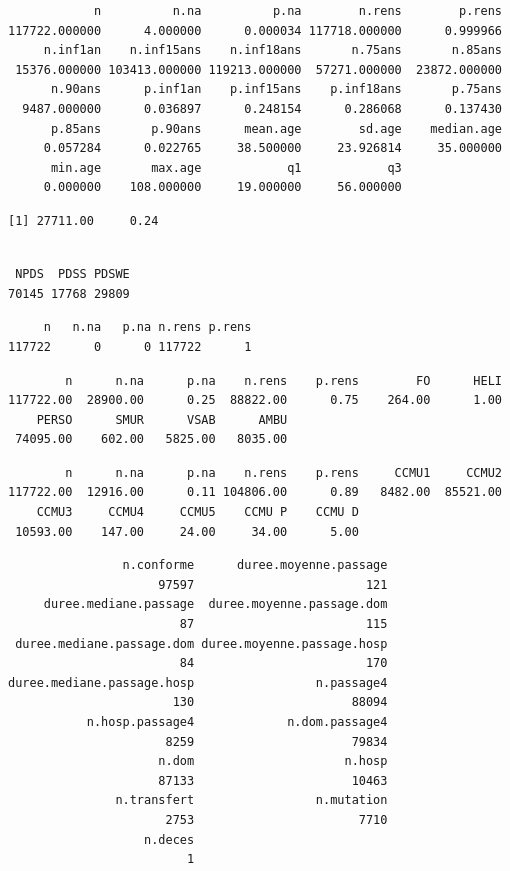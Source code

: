 \documentclass[]{article}
\begin{document}
\begin{verbatim}
            n          n.na          p.na        n.rens        p.rens 
117722.000000      4.000000      0.000034 117718.000000      0.999966 
     n.inf1an    n.inf15ans    n.inf18ans       n.75ans       n.85ans 
 15376.000000 103413.000000 119213.000000  57271.000000  23872.000000 
      n.90ans      p.inf1an    p.inf15ans    p.inf18ans       p.75ans 
  9487.000000      0.036897      0.248154      0.286068      0.137430 
      p.85ans       p.90ans      mean.age        sd.age    median.age 
     0.057284      0.022765     38.500000     23.926814     35.000000 
      min.age       max.age            q1            q3 
     0.000000    108.000000     19.000000     56.000000 
\end{verbatim}

\begin{verbatim}
[1] 27711.00     0.24
\end{verbatim}

\begin{verbatim}

 NPDS  PDSS PDSWE 
70145 17768 29809 
\end{verbatim}

\begin{verbatim}
     n   n.na   p.na n.rens p.rens 
117722      0      0 117722      1 
\end{verbatim}

\begin{verbatim}
        n      n.na      p.na    n.rens    p.rens        FO      HELI 
117722.00  28900.00      0.25  88822.00      0.75    264.00      1.00 
    PERSO      SMUR      VSAB      AMBU 
 74095.00    602.00   5825.00   8035.00 
\end{verbatim}

\begin{verbatim}
        n      n.na      p.na    n.rens    p.rens     CCMU1     CCMU2 
117722.00  12916.00      0.11 104806.00      0.89   8482.00  85521.00 
    CCMU3     CCMU4     CCMU5    CCMU P    CCMU D 
 10593.00    147.00     24.00     34.00      5.00 
\end{verbatim}

\begin{verbatim}
                n.conforme      duree.moyenne.passage 
                     97597                        121 
     duree.mediane.passage  duree.moyenne.passage.dom 
                        87                        115 
 duree.mediane.passage.dom duree.moyenne.passage.hosp 
                        84                        170 
duree.mediane.passage.hosp                 n.passage4 
                       130                      88094 
           n.hosp.passage4             n.dom.passage4 
                      8259                      79834 
                     n.dom                     n.hosp 
                     87133                      10463 
               n.transfert                 n.mutation 
                      2753                       7710 
                   n.deces 
                         1 
\end{verbatim}
\end{document}
